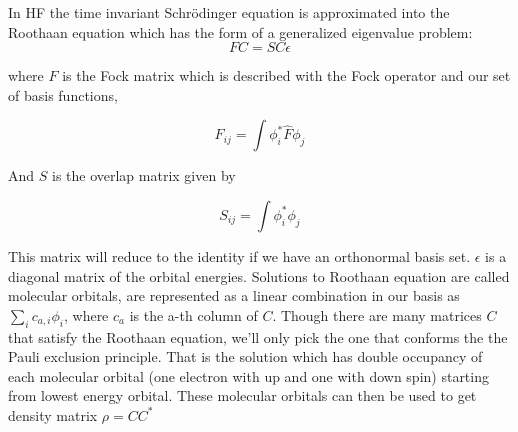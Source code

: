 \documentclass[twoside,11pt]{article}
\begin{document}
In HF the time invariant Schr\"{o}dinger equation is approximated into the Roothaan equation which has the form of a generalized eigenvalue problem:
\[
FC = SC\epsilon
\]



where $F$ is the Fock matrix which is described with the Fock operator and our set of basis functions,

\[
F_{ij} = \int \phi_i^*\hat{F}\phi_j
\]

And $S$ is the overlap matrix given by

\[
S_{ij} = \int \phi_i^*\phi_j
\]


This matrix will reduce to the identity if we have an orthonormal basis set. $\epsilon$ is a diagonal matrix of the orbital energies. 
Solutions to Roothaan equation are called molecular orbitals, are represented as a linear combination in our basis as $\sum_i c_{a,i}\phi_i$, where $c_{a}$ is the a-th column of $C$. 
Though there are many matrices $C$ that satisfy the Roothaan equation, 
we'll only pick the one that conforms the the Pauli exclusion principle.
That is the solution which has double occupancy of each molecular orbital (one electron with up and one with down spin) starting from lowest energy orbital. These molecular orbitals can then be used to get density matrix $\rho = CC^*$ 







\end{document}
